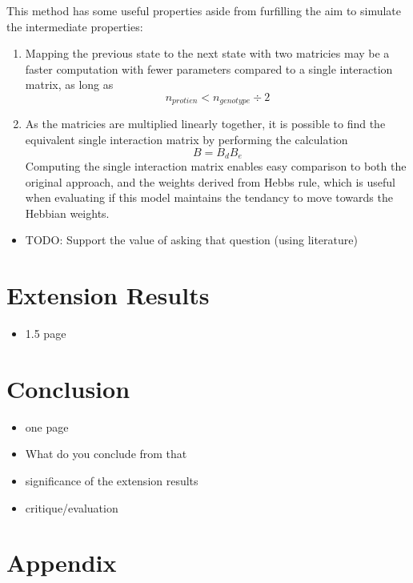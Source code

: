 \documentclass[twocolumn,a4paper]{article}
\begin{document}
    This method has some useful properties aside from furfilling the aim to simulate the intermediate properties:
    \begin{enumerate}
        \item Mapping the previous state to the next state with two matricies may be a faster computation with fewer parameters compared to a single interaction matrix, as long as
        \begin{equation}
            n_{protien} < n_{genotype} \div 2
        \end{equation}
            
        \item As the matricies are multiplied linearly together, it is possible to find the equivalent single interaction matrix by performing the calculation
        \begin{equation}
            B = B_dB_e
        \end{equation}
        Computing the single interaction matrix enables easy comparison to both the original approach, and the weights derived from Hebbs rule, which is useful when evaluating if this model maintains the tendancy to move towards the Hebbian weights.
    \end{enumerate}
    \begin{itemize}
        \item TODO: Support the value of asking that question (using literature)
    \end{itemize}


    \section{Extension Results}
    \begin{itemize}
        \item 1.5 page
    \end{itemize}


    \section{Conclusion}
    \begin{itemize}
        \item one page
        \item What do you conclude from that
        \item significance of the extension results
        \item critique/evaluation
    \end{itemize}


    \section{Appendix}
\end{document}
